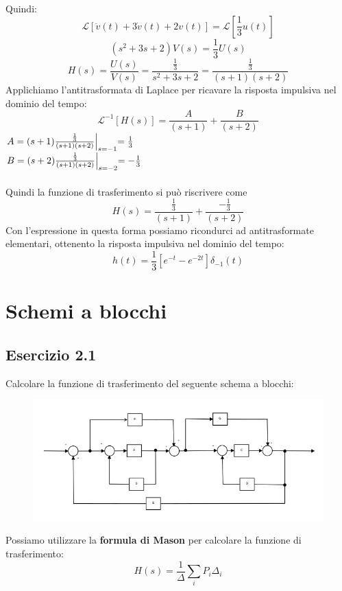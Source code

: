 \documentclass[12pt,a4paper]{article}
\begin{document}
\begin{enumerate}
		Quindi:
		\[
			\mathcal{L}[\ddot{v}(t) + 3\dot{v}(t) + 2v(t)] = \mathcal{L}[\frac{1}{3}u(t)]
		\]
		\[
			(s^2 + 3s + 2)V(s) = \frac{1}{3}U(s)
		\]
		\[
			H(s) = \frac{U(s)}{V(s)} = \frac{\frac{1}{3}}{s^2 + 3s + 2} = \frac{\frac{1}{3}}{(s+1)(s+2)}
		\]
		Applichiamo l'antitrasformata di Laplace per ricavare la risposta impulsiva nel dominio del tempo:
		\[
			\mathcal{L}^{-1}[H(s)] = \frac{A}{(s+1)} + \frac{B}{(s+2)} 
		\]
		$A = (s+1)\frac{\frac{1}{3}}{(s+1)(s+2)}\Bigl\lvert_{s = -1} = \frac{1}{3} $ 
		\vspace{5mm}
		\\
		$B = (s+2)\frac{\frac{1}{3}}{(s+1)(s+2)}\Bigl\lvert_{s = -2} = -\frac{1}{3} $\\ \\
		Quindi la funzione di trasferimento si può riscrivere come
		\[
			H(s) = \frac{\frac{1}{3}}{(s+1)} + \frac{-\frac{1}{3}}{(s+2)}
		\]
		Con l'espressione in questa forma possiamo ricondurci ad antitrasformate elementari, ottenento la risposta impulsiva nel dominio del tempo:
		\[
			h(t) =\frac{1}{3}[e^{-t} - e^{-2t}]\delta_{-1}(t)
		\]
	\end{enumerate}
	\newpage
	\section{Schemi a blocchi}
	\subsection*{Esercizio 2.1}
	Calcolare la funzione di trasferimento del seguente schema a blocchi:
	\begin{figure}[h!]
		\centering
		\includegraphics[scale=0.6]{./images/schema21.png}
	\end{figure}

	Possiamo utilizzare la \textbf{formula di Mason} per calcolare la funzione di trasferimento:
	\[
		H(s) = \frac{1}{\Delta}\sum_i P_i \Delta_i
	\]
\end{document}

